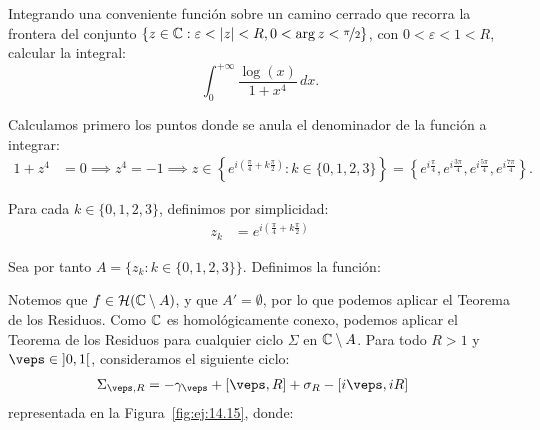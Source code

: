 \begin{ejercicio}\label{ej:14.15}
    Integrando una conveniente función sobre un camino cerrado que recorra la frontera del conjunto $\{z \in \mathbb{C} : \varepsilon < |z| < R, 0 < \arg z < \nicefrac{\pi}{2}\}$, con $0 < \varepsilon < 1 < R$, calcular la integral:
    \begin{equation*}
        \int_0^{+\infty} \frac{\log(x)}{1 + x^4} \, dx.
    \end{equation*}

    Calculamos primero los puntos donde se anula el denominador de la función a integrar:
    \begin{align*}
        1 + z^4 &= 0 \implies z^4 = -1 \implies z\in \left\{e^{i\left(\frac{\pi}{4} + k\frac{\pi}{2}\right)} : k\in \{0, 1, 2, 3\}\right\}
        = \left\{e^{i\frac{\pi}{4}}, e^{i\frac{3\pi}{4}}, e^{i\frac{5\pi}{4}}, e^{i\frac{7\pi}{4}}\right\}.
    \end{align*}

    Para cada $k\in \{0, 1, 2, 3\}$, definimos por simplicidad:
    \begin{align*}
        z_k &= e^{i\left(\frac{\pi}{4} + k\frac{\pi}{2}\right)}
    \end{align*}

    Sea por tanto $A = \{z_k : k\in \{0, 1, 2, 3\}\}$. Definimos la función:

    Notemos que $f\in \mathcal{H}(\mathbb{C}\setminus A)$, y que $A'=\emptyset$, por lo que podemos aplicar el Teorema de los Residuos. Como $\mathbb{C}$ es homológicamente conexo, podemos aplicar el Teorema de los Residuos para cualquier ciclo $\Sigma$ en $\mathbb{C}\setminus A$. Para todo $R>1$ y $\veps\in \left]0, 1\right[$, consideramos el siguiente ciclo:
    \begin{align*}
        \Sigma_{\veps, R} &= -\gamma_{\veps} + [\veps, R] + \sigma_R - [i\veps, iR]
    \end{align*}
    representada en la Figura~\ref{fig:ej:14.15}, donde:
    \begin{figure}
        \centering
\end{figure}
\end{ejercicio}
